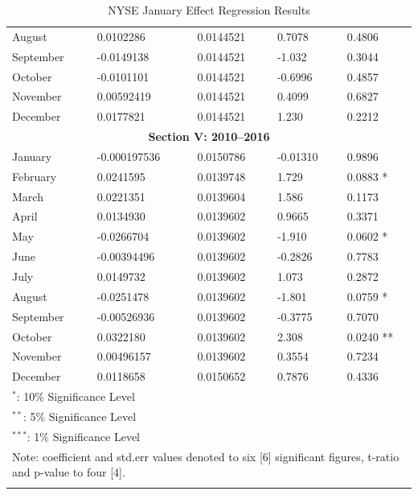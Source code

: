 \documentclass[11pt, english]{article}
\begin{document}
\begin{center}
\begin{longtable}{p{2cm}p{2cm}p{2cm}p{2cm}p{2cm}}
                August & 0.0102286 & 0.0144521 & 0.7078 & 0.4806\\
                September & -0.0149138 & 0.0144521 & -1.032 & 0.3044\\
                October & -0.0101101 & 0.0144521 & -0.6996 & 0.4857\\
                November & 0.00592419 & 0.0144521 & 0.4099 & 0.6827\\
                December & 0.0177821 & 0.0144521 & 1.230 & 0.2212\\
                \hline
                \multicolumn{5}{c}{\textbf{Section V: 2010--2016}}\\
		\hline
		January & -0.000197536 & 0.0150786 & -0.01310 & 0.9896\\
                February & 0.0241595 & 0.0139748 & 1.729 & 0.0883 *\\   
                March & 0.0221351 & 0.0139604 & 1.586 & 0.1173\\
                April & 0.0134930 & 0.0139602 & 0.9665 & 0.3371\\
                May & -0.0266704 & 0.0139602 & -1.910 & 0.0602 *\\
                June & -0.00394496 & 0.0139602 & -0.2826 & 0.7783\\
                July & 0.0149732 & 0.0139602 & 1.073 & 0.2872\\
                August & -0.0251478 & 0.0139602 & -1.801 & 0.0759 *\\
                September & -0.00526936 & 0.0139602 & -0.3775 & 0.7070\\
                October & 0.0322180 & 0.0139602 & 2.308 & 0.0240 **\\
                November & 0.00496157 & 0.0139602 & 0.3554 & 0.7234\\
                December & 0.0118658 & 0.0150652 & 0.7876 & 0.4336\\
		\hline
		\multicolumn{5}{l}{$^*$: 10\% Significance Level}\\
                \multicolumn{5}{l}{$^{**}$: 5\% Significance Level}\\
                \multicolumn{5}{l}{$^{***}$: 1\% Significance Level}\\
		\hline
		\multicolumn{5}{p{11.5cm}}{Note: coefficient and std.err values denoted to six [6] significant figures, t-ratio and p-value to four [4].}\\
                \hline
		\caption{NYSE January Effect Regression Results}
	\end{longtable}
	\end{center}
\end{document}
